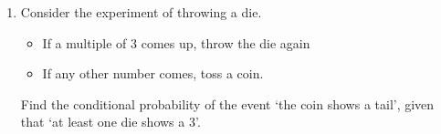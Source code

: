 \begin{enumerate}[label=\thechapter.\arabic*,ref=\thechapter.\theenumi]
	\item Consider the experiment of throwing a die.
    \begin{itemize}
        \item If a multiple of 3 comes up, throw the die again
        \item If any other number comes, toss a coin.
    \end{itemize}
     Find the conditional probability of the event \lq the coin shows a tail\rq, given that \lq at least one die shows a 3\rq.\\
		
\end{enumerate}

